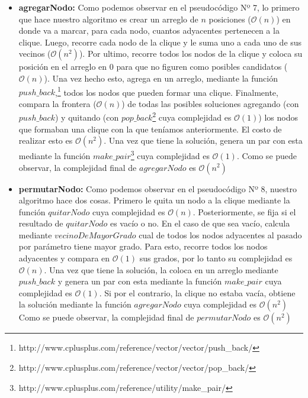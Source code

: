 \begin{itemize}
\item \textbf{agregarNodo:} \newline 
Como podemos observar en el pseudocódigo Nº 7, lo primero que hace nuestro algoritmo es crear un arreglo de $n$ posiciones ($\mathcal{O}(n)$) en donde va a marcar, para cada nodo, cuantos adyacentes pertenecen a la clique. Luego, recorre cada nodo de la clique y le suma uno a cada uno de sus vecinos ($\mathcal{O}(n^{2})$). Por ultimo, recorre todos los nodos de la clique y coloca su posición en el arreglo en 0 para que no figuren como posibles candidatos ($\mathcal{O}(n)$). \newline
Una vez hecho esto, agrega en un arreglo, mediante la función $push\_back$,\footnote{http://www.cplusplus.com/reference/vector/vector/push\_back/} todos los nodos que pueden formar una clique. Finalmente, compara la frontera ($\mathcal{O}(n)$) de todas las posibles soluciones agregando (con $push\_back$) y quitando (con $pop\_back$\footnote{http://www.cplusplus.com/reference/vector/vector/pop\_back/} cuya complejidad es $\mathcal{O}(1)$) los nodos que formaban una clique con la que teníamos anteriormente. El costo de realizar esto es $\mathcal{O}(n^{2})$. \newline
Una vez que tiene la solución, genera un par con esta mediante la función $make\_pair$\footnote{http://www.cplusplus.com/reference/utility/make\_pair/} cuya complejidad es $\mathcal{O}(1)$.
\newline
Como se puede observar, la complejidad final de $agregarNodo$ es $\mathcal{O}(n^{2})$

\item \textbf{permutarNodo:} \newline 
Como podemos observar en el pseudocódigo Nº 8, nuestro algoritmo hace dos cosas. Primero le quita un nodo a la clique mediante la función $quitarNodo$ cuya complejidad es $\mathcal{O}(n)$. Posteriormente, se fija si el resultado de $quitarNodo$ es vacío o no. \newline
En el caso de que sea vacío, calcula mediante $vecinoDeMayorGrado$ cual de todos los nodos adyacentes al pasado por parámetro tiene mayor grado. Para esto, recorre todos los nodos adyacentes y compara en $\mathcal{O}(1)$ sus grados, por lo tanto su complejidad es $\mathcal{O}(n)$. Una vez que tiene la solución, la coloca en un arreglo mediante $push\_back$ y genera un par con esta mediante la función $make\_pair$ cuya complejidad es $\mathcal{O}(1)$.
\newline
Si por el contrario, la clique no estaba vacía, obtiene la solución mediante la función $agregarNodo$ cuya complejidad es $\mathcal{O}(n^{2})$
\newline
Como se puede observar, la complejidad final de $permutarNodo$ es $\mathcal{O}(n^{2})$


\end{itemize}
